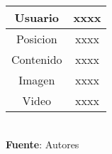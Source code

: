 \begin{table}[!htb]
\begin{center}
{\begin{tabular}{|p{4cm}|p{4cm}|p{4cm}|p{4cm}|}
			\hline
			\multicolumn{2}{|c|}{Usuario} & 
			\multicolumn{2}{c|}{xxxx} \\
			\hline
			\multicolumn{2}{|c|}{Posicion} & 
			\multicolumn{2}{c|}{xxxx} \\
			\hline
			\multicolumn{2}{|c|}{Contenido} & 
			\multicolumn{2}{c|}{xxxx} \\
			\hline
			\multicolumn{2}{|c|}{Imagen} & 
			\multicolumn{2}{c|}{xxxx} \\
			\hline
			\multicolumn{2}{|c|}{Video} & 
			\multicolumn{2}{c|}{xxxx} \\
			\hline
		\end{tabular}
		} \\
		\textbf{Fuente}: Autores
	\end{center}
\end{table}